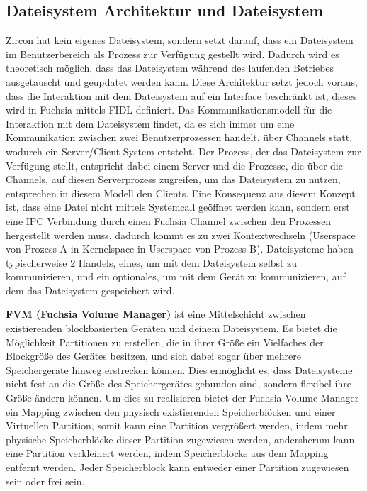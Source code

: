 \documentclass[a4paper]{scrartcl}
\begin{document}
\subsection{Dateisystem Architektur und Dateisystem}
Zircon hat kein eigenes Dateisystem, sondern setzt darauf, dass ein Dateisystem im Benutzerbereich als Prozess zur Verfügung gestellt wird. Dadurch wird es theoretisch möglich, dass das Dateisystem während des laufenden Betriebes ausgetauscht und geupdatet werden kann. Diese Architektur setzt jedoch voraus, dass die Interaktion mit dem Dateisystem auf ein Interface beschränkt ist, dieses wird in Fuchsia mittels FIDL definiert. \cite{Fuchsia.FIDL.io}\cite{Fuchsia.FIDL.io2} Das Kommunikationsmodell für die Interaktion mit dem Dateisystem findet, da es sich immer um eine Kommunikation zwischen zwei Benutzerprozessen handelt, über Channels statt, wodurch ein Server/Client System entsteht. Der Prozess, der das Dateisystem zur Verfügung stellt, entspricht dabei einem Server und die Prozesse, die über die Channels, auf diesen Serverprozess zugreifen, um das Dateisystem zu nutzen, entsprechen in diesem Modell den Clients. Eine Konsequenz aus diesem Konzept ist, dass eine Datei nicht mittels Systemcall geöffnet werden kann, sondern erst eine IPC Verbindung durch einen Fuchsia Channel \cite{Fuchsia.Kernel.KernelObjects} zwischen den Prozessen hergestellt werden muss, dadurch kommt es zu zwei Kontextwechseln (Userspace von Prozess A in Kernelspace in Userspace von Prozess B). Dateisysteme haben typischerweise 2 Handels, eines, um mit dem Dateisystem selbst zu kommunizieren, und ein optionales, um mit dem Gerät zu kommunizieren, auf dem das Dateisystem gespeichert wird.

\textbf{FVM (Fuchsia Volume Manager)} ist eine Mittelschicht zwischen existierenden blockbasierten Geräten und deinem Dateisystem. Es bietet die Möglichkeit Partitionen zu erstellen, die in ihrer Größe ein Vielfaches der Blockgröße des Gerätes besitzen, und sich dabei sogar über mehrere Speichergeräte hinweg erstrecken können. Dies ermöglicht es, dass Dateisysteme nicht fest an die Größe des Speichergerätes gebunden sind, sondern flexibel ihre Größe ändern können. Um dies zu realisieren bietet der Fuchsia Volume Manager ein Mapping zwischen den physisch existierenden Speicherblöcken und einer Virtuellen Partition, somit kann eine Partition vergrößert werden, indem mehr physische Speicherblöcke dieser Partition zugewiesen werden, andersherum kann eine Partition verkleinert werden, indem Speicherblöcke aus dem Mapping entfernt werden. Jeder Speicherblock kann entweder einer Partition zugewiesen sein oder frei sein.
\end{document}
